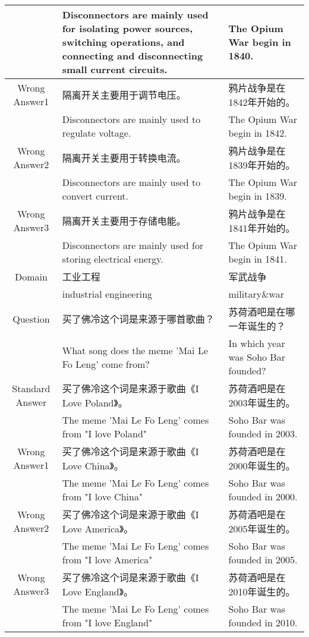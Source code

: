 \begin{CJK*}{UTF8}{gbsn}
\begin{table*}[ht]
{\begin{tabular}{c|p{10cm}|p{10cm}}
    & Disconnectors are mainly used for isolating power sources, switching operations, and connecting and disconnecting small current circuits. & The Opium War begin in 1840.  \\
    \midrule
    Wrong Answer1 & 隔离开关主要用于调节电压。 &鸦片战争是在1842年开始的。\\
    & Disconnectors are mainly used to regulate voltage. & The Opium War begin in 1842. \\
    \midrule
    Wrong Answer2 & 隔离开关主要用于转换电流。 & 鸦片战争是在1839年开始的。 \\
    & Disconnectors are mainly used to convert current. & The Opium War begin in 1839.  \\
    \midrule
    Wrong Answer3 & 隔离开关主要用于存储电能。 & 鸦片战争是在1841年开始的。\\
    & Disconnectors are mainly used for storing electrical energy. &  The Opium War begin in 1841. \\ 
    \midrule
    Domain & 工业工程  & 军武战争 \\
    & industrial engineering & military\&war \\
    \midrule[1.5pt]
    \rowcolor{blue!10} Question & 买了佛冷这个词是来源于哪首歌曲？ & 苏荷酒吧是在哪一年诞生的？ \\
    \rowcolor{blue!10} & What song does the meme 'Mai Le Fo Leng' come from? & In which year was Soho Bar founded?  \\ 
    \midrule
    Standard Answer & 买了佛冷这个词是来源于歌曲《I Love Poland》。 & 苏荷酒吧是在2003年诞生的。 \\
    & The meme 'Mai Le Fo Leng' comes from "I love Poland"  & Soho Bar was founded in 2003. \\
    \midrule
    Wrong Answer1 & 买了佛冷这个词是来源于歌曲《I Love China》。 &苏荷酒吧是在2000年诞生的。\\
    & The meme 'Mai Le Fo Leng' comes from "I love China" & Soho Bar was founded in 2000. \\
    \midrule
    Wrong Answer2 & 买了佛冷这个词是来源于歌曲《I Love America》。 & 苏荷酒吧是在2005年诞生的。 \\
    & The meme 'Mai Le Fo Leng' comes from "I love America" &Soho Bar was founded in 2005. \\
    \midrule
    Wrong Answer3 & 买了佛冷这个词是来源于歌曲《I Love England》。 &  苏荷酒吧是在2010年诞生的。\\
    & The meme 'Mai Le Fo Leng' comes from "I love England" &  Soho Bar was founded in 2010. \\ 

\end{tabular}}
\end{table*}
\end{CJK*}
